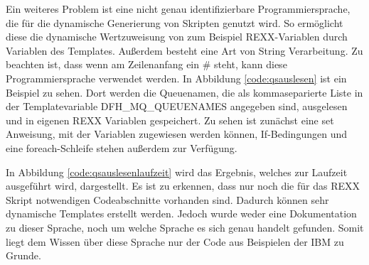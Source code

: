 Ein weiteres Problem ist eine nicht genau identifizierbare Programmiersprache, die für die dynamische Generierung von Skripten genutzt wird.
So ermöglicht diese die dynamische Wertzuweisung von zum Beispiel REXX-Variablen durch Variablen des Templates.
Außerdem besteht eine Art von String Verarbeitung.
Zu beachten ist, dass wenn am Zeilenanfang ein \glqq\#\grqq{} steht, kann diese Programmiersprache verwendet werden.
In Abbildung \ref{code:qsauslesen} ist ein Beispiel zu sehen.
Dort werden die Queuenamen, die als kommaseparierte Liste in der Templatevariable \glqq DFH\_MQ\_QUEUENAMES\grqq{} angegeben sind, ausgelesen und in eigenen REXX Variablen gespeichert.
Zu sehen ist zunächst eine \glqq set\grqq{} Anweisung, mit der Variablen zugewiesen werden können, If-Bedingungen und eine foreach-Schleife stehen außerdem zur Verfügung.

\begin{minipage}{\linewidth}

\end{minipage}

In Abbildung \ref{code:qsauslesenlaufzeit} wird das Ergebnis, welches zur Laufzeit ausgeführt wird, dargestellt.
Es ist zu erkennen, dass nur noch die für das REXX Skript notwendigen Codeabschnitte vorhanden sind.
Dadurch können sehr dynamische Templates erstellt werden.
Jedoch wurde weder eine Dokumentation zu dieser Sprache, noch um welche Sprache es sich genau handelt gefunden.
Somit liegt dem Wissen über diese Sprache nur der Code aus Beispielen der IBM zu Grunde.

\begin{minipage}{\linewidth}

\end{minipage}

